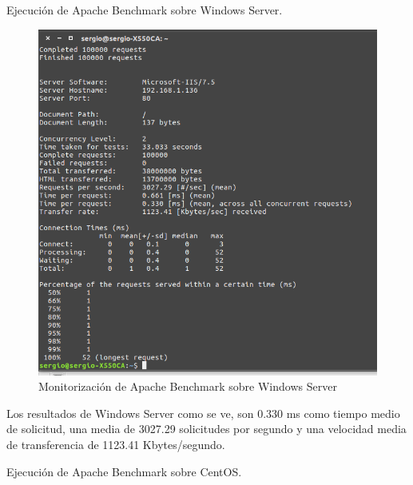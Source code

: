 \setlength{\parskip}{10pt}

Ejecución de Apache Benchmark sobre Windows Server.
\begin{figure}[H] %
	\centering
	\includegraphics[scale=0.5]{imagenes/ab-ws.png}  %
	\caption{Monitorización de Apache Benchmark sobre Windows Server}
\end{figure}
Los resultados de Windows Server como se ve, son 0.330 ms como tiempo medio de solicitud, una media de 3027.29 solicitudes por segundo y una velocidad media de transferencia de 1123.41 Kbytes/segundo.

\setlength{\parskip}{10pt}

Ejecución de Apache Benchmark sobre CentOS.

